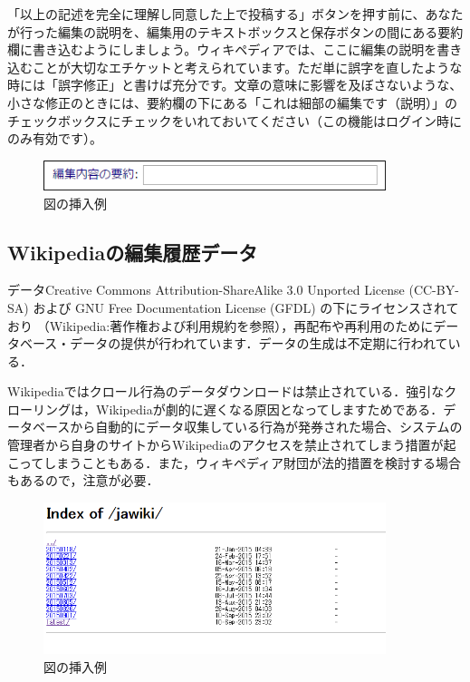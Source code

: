「以上の記述を完全に理解し同意した上で投稿する」ボタンを押す前に、あなたが行った編集の説明を、編集用のテキストボックスと保存ボタンの間にある要約欄に書き込むようにしましょう。ウィキペディアでは、ここに編集の説明を書き込むことが大切なエチケットと考えられています。ただ単に誤字を直したような時には「誤字修正」と書けば充分です。文章の意味に影響を及ぼさないような、小さな修正のときには、要約欄の下にある「これは細部の編集です（説明）」のチェックボックスにチェックをいれておいてください（この機能はログイン時にのみ有効です）。\cite{wikiEdit}

\begin{figure}[htb]
\centering
\includegraphics[width=10cm]{sample3.png}
\caption{図の挿入例}\label{サンプル図}
\end{figure}

\subsection{Wikipediaの編集履歴データ}

データCreative Commons Attribution-ShareAlike 3.0 Unported License (CC-BY-SA) および GNU Free Documentation License (GFDL) の下にライセンスされており （Wikipedia:著作権および利用規約を参照），再配布や再利用のためにデータベース・データの提供が行われています．データの生成は不定期に行われている．

Wikipediaではクロール行為のデータダウンロードは禁止されている．強引なクローリングは，Wikipediaが劇的に遅くなる原因となってしますためである．データベースから自動的にデータ収集している行為が発券された場合、システムの管理者から自身のサイトからWikipediaのアクセスを禁止されてしまう措置が起こってしまうこともある．また，ウィキペディア財団が法的措置を検討する場合もあるので，注意が必要．

\begin{figure}[htb]
\centering
\includegraphics[width=10cm]{sample4.png}
\caption{図の挿入例}\label{サンプル図}
\end{figure}

